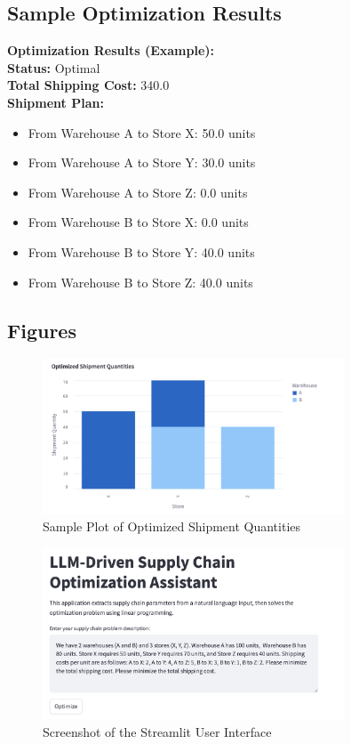 \documentclass[11pt]{article}
\begin{document}
\subsection*{Sample Optimization Results}
\textbf{Optimization Results (Example):} \\
\textbf{Status:} Optimal \\
\textbf{Total Shipping Cost:} 340.0 \\
\textbf{Shipment Plan:}
\begin{itemize}
    \item From Warehouse A to Store X: 50.0 units
    \item From Warehouse A to Store Y: 30.0 units
    \item From Warehouse A to Store Z: 0.0 units
    \item From Warehouse B to Store X: 0.0 units
    \item From Warehouse B to Store Y: 40.0 units
    \item From Warehouse B to Store Z: 40.0 units
\end{itemize}

\subsection*{Figures}
\begin{figure}[H]
    \centering
    \includegraphics[width=0.8\textwidth]{results_plot.png}
    \caption{Sample Plot of Optimized Shipment Quantities}
    \label{fig:results_plot}
\end{figure}

\begin{figure}[H]
    \centering
    \includegraphics[width=0.8\textwidth]{ui_screenshot.png}
    \caption{Screenshot of the Streamlit User Interface}
    \label{fig:ui_screenshot}
\end{figure}
\end{document}
